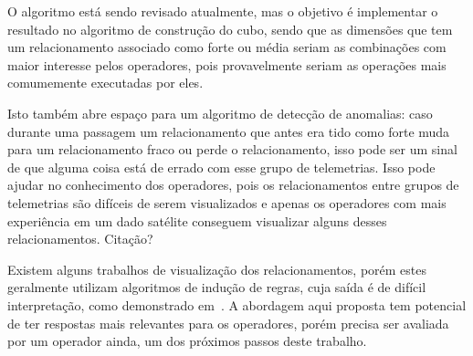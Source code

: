 O algoritmo está sendo revisado atualmente, mas o objetivo é implementar o resultado no algoritmo de construção do cubo, sendo que as dimensões que tem um relacionamento associado como forte ou média seriam as combinações com maior interesse pelos operadores, pois provavelmente seriam as operações mais comumemente executadas por eles.

Isto também abre espaço para um algoritmo de detecção de anomalias: caso durante uma passagem um relacionamento que antes era tido como forte muda para um relacionamento fraco ou perde o relacionamento, isso pode ser um sinal de que alguma coisa está de errado com esse grupo de telemetrias.
Isso pode ajudar no conhecimento dos operadores, pois os relacionamentos entre grupos de telemetrias são difíceis de serem visualizados e apenas os operadores com mais experiência em um dado satélite conseguem visualizar alguns desses relacionamentos.
{\color{red} Citação?}

Existem alguns trabalhos de visualização dos relacionamentos, porém estes geralmente utilizam algoritmos de indução de regras, cuja saída é de difícil interpretação, como demonstrado em~\cite{kannanMiningSatelliteTelemetry2016}.
A abordagem aqui proposta tem potencial de ter respostas mais relevantes para os operadores, porém precisa ser avaliada por um operador ainda, um dos próximos passos deste trabalho.

